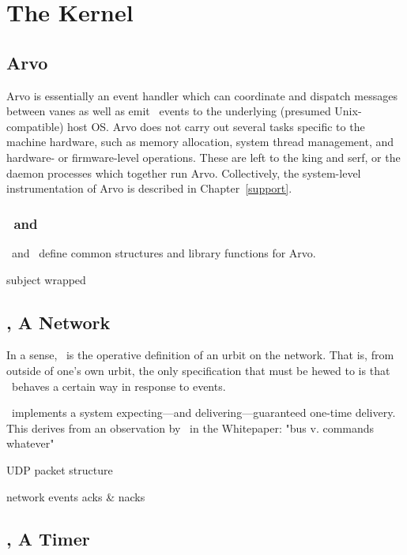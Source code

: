 \setchapterpreamble[u]{\margintoc}
\chapter{The Kernel}


\section{Arvo}

Arvo is essentially an event handler which can coordinate and dispatch messages between vanes as well as emit \unix~events to the underlying (presumed Unix-compatible) host OS.  Arvo does not carry out several tasks specific to the machine hardware, such as memory allocation, system thread management, and hardware- or firmware-level operations.  These are left to the king and serf, or the daemon processes which together run Arvo.  Collectively, the system-level instrumentation of Arvo is described in Chapter~\ref{support}.

\subsection[\zuse~\&~\lull]{\zuse~and \lull}

\zuse~and \lull~define common structures and library functions for Arvo.

subject wrapped

\section[\ames]{\ames, A Network}

In a sense, \ames~is the operative definition of an urbit on the network.  That is, from outside of one's own urbit, the only specification that must be hewed to is that \ames~behaves a certain way in response to events.

\ames~implements a system expecting—and delivering—guaranteed one-time delivery.  This derives from an observation by \citeauthor{Yarvin2016}~in the Whitepaper:  "bus v. commands whatever"

UDP packet structure

network events
acks \& nacks


\section[\behn]{\behn, A Timer}

